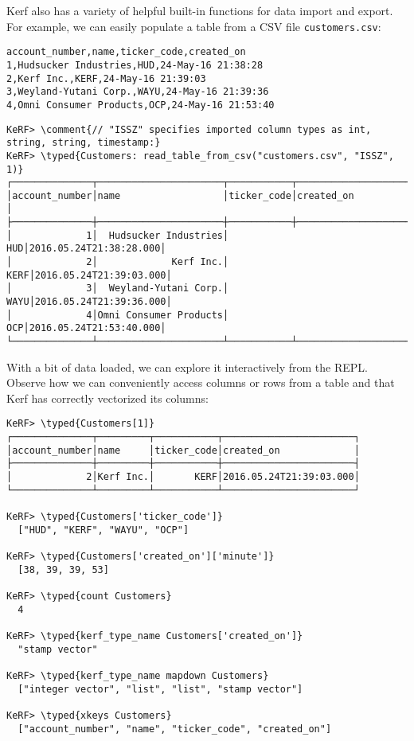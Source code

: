 \documentclass{article}
\newcommand{\typed}[1]{\textcolor{TealBlue}{#1}}
\newcommand{\comment}[1]{\textcolor{Orange}{#1}}
\begin{document}
Kerf also has a variety of helpful built-in functions for data import and export. For example, we can easily populate a table from a CSV file \texttt{customers.csv}:

\begin{Verbatim}
account_number,name,ticker_code,created_on
1,Hudsucker Industries,HUD,24-May-16 21:38:28
2,Kerf Inc.,KERF,24-May-16 21:39:03
3,Weyland-Yutani Corp.,WAYU,24-May-16 21:39:36
4,Omni Consumer Products,OCP,24-May-16 21:53:40
\end{Verbatim}
\begin{Verbatim}
KeRF> \comment{// "ISSZ" specifies imported column types as int, string, string, timestamp:}
KeRF> \typed{Customers: read_table_from_csv("customers.csv", "ISSZ", 1)}
┌──────────────┬──────────────────────┬───────────┬───────────────────────┐
│account_number│name                  │ticker_code│created_on             │
├──────────────┼──────────────────────┼───────────┼───────────────────────┤
│             1│  Hudsucker Industries│        HUD│2016.05.24T21:38:28.000│
│             2│             Kerf Inc.│       KERF│2016.05.24T21:39:03.000│
│             3│  Weyland-Yutani Corp.│       WAYU│2016.05.24T21:39:36.000│
│             4│Omni Consumer Products│        OCP│2016.05.24T21:53:40.000│
└──────────────┴──────────────────────┴───────────┴───────────────────────┘
\end{Verbatim}

\pagebreak
With a bit of data loaded, we can explore it interactively from the REPL. Observe how we can conveniently access columns or rows from a table and that Kerf has correctly vectorized its columns:

\begin{Verbatim}
KeRF> \typed{Customers[1]}
┌──────────────┬─────────┬───────────┬───────────────────────┐
│account_number│name     │ticker_code│created_on             │
├──────────────┼─────────┼───────────┼───────────────────────┤
│             2│Kerf Inc.│       KERF│2016.05.24T21:39:03.000│
└──────────────┴─────────┴───────────┴───────────────────────┘

KeRF> \typed{Customers['ticker_code']}
  ["HUD", "KERF", "WAYU", "OCP"]

KeRF> \typed{Customers['created_on']['minute']}
  [38, 39, 39, 53]

KeRF> \typed{count Customers}
  4

KeRF> \typed{kerf_type_name Customers['created_on']}
  "stamp vector"

KeRF> \typed{kerf_type_name mapdown Customers}
  ["integer vector", "list", "list", "stamp vector"]

KeRF> \typed{xkeys Customers}
  ["account_number", "name", "ticker_code", "created_on"]
\end{Verbatim}
\end{document}
